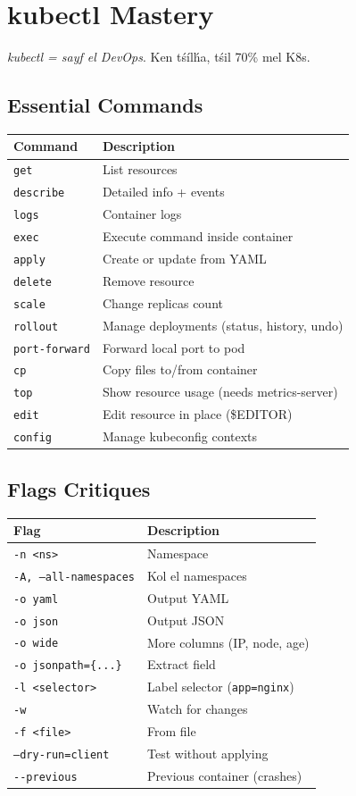 \documentclass[11pt,a4paper]{book}
\newcommand{\tuni}[1]{\textit{\color{k8sdark}#1}}
\newcommand{\cmd}[1]{\texttt{#1}}
\begin{document}
\chapter{kubectl Mastery}

\tuni{kubectl = sayf el DevOps}. Ken t\'s\'il\'ha, t\'sil 70\% mel K8s.

\section{Essential Commands}

\begin{longtable}{L{3cm}L{9cm}}
\toprule
\textbf{Command} & \textbf{Description} \\
\midrule
\cmd{get} & List resources \\
\cmd{describe} & Detailed info + events \\
\cmd{logs} & Container logs \\
\cmd{exec} & Execute command inside container \\
\cmd{apply} & Create or update from YAML \\
\cmd{delete} & Remove resource \\
\cmd{scale} & Change replicas count \\
\cmd{rollout} & Manage deployments (status, history, undo) \\
\cmd{port-forward} & Forward local port to pod \\
\cmd{cp} & Copy files to/from container \\
\cmd{top} & Show resource usage (needs metrics-server) \\
\cmd{edit} & Edit resource in place (\$EDITOR) \\
\cmd{config} & Manage kubeconfig contexts \\
\bottomrule
\end{longtable}

\section{Flags Critiques}

\begin{longtable}{L{3.5cm}L{8.5cm}}
\toprule
\textbf{Flag} & \textbf{Description} \\
\midrule
\texttt{-n <ns>} & Namespace \\
\texttt{-A, --all-namespaces} & Kol el namespaces \\
\texttt{-o yaml} & Output YAML \\
\texttt{-o json} & Output JSON \\
\texttt{-o wide} & More columns (IP, node, age) \\
\texttt{-o jsonpath=\{...\}} & Extract field \\
\texttt{-l <selector>} & Label selector (\texttt{app=nginx}) \\
\texttt{-w} & Watch for changes \\
\texttt{-f <file>} & From file \\
\texttt{--dry-run=client} & Test without applying \\
\texttt{-{}-previous} & Previous container (crashes) \\
\bottomrule
\end{longtable}
\end{document}
